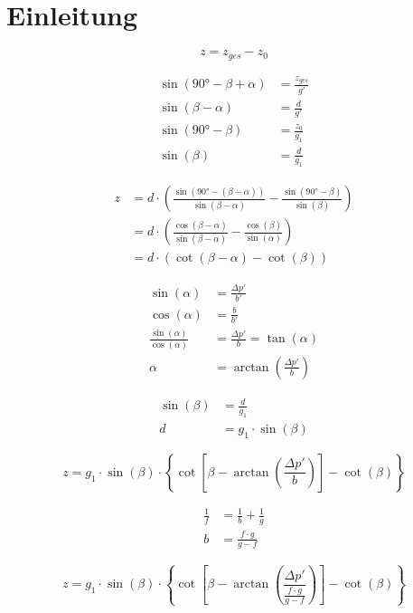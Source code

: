 \section{Einleitung}

\begin{equation}
	z = z_{ges} - z_0
\end{equation}

\begin{align}
	\sin(\ang{90}-\beta+\alpha) &= \frac{z_{ges}}{g'}\\ \sin(\beta-\alpha) &= \frac{d}{g'}\\
	\sin(\ang{90}-\beta) &= \frac{z_0}{g_1}\\ \sin(\beta) &= \frac{d}{g_1}
\end{align}

\begin{align}
	z &= d\cdot\left(\frac{\sin(\ang{90}-(\beta-\alpha))}{\sin(\beta-\alpha)}-\frac{\sin(\ang{90}-\beta)}{\sin(\beta)}\right)\\
	  &= d\cdot\left(\frac{\cos(\beta-\alpha)}{\sin(\beta-\alpha)}-\frac{\cos(\beta)}{\sin(\alpha)}\right)\\
	  &= d\cdot\left(\cot(\beta-\alpha)-\cot(\beta)\right)
\end{align}

\begin{align}
	\sin(\alpha) &= \frac{\Delta p'}{b'}\\
	\cos(\alpha) &= \frac{b}{b'}\\
	\frac{\sin(\alpha)}{\cos(\alpha)} &= \frac{\Delta p'}{b} = \tan(\alpha)\\
	\alpha &= \arctan\left(\frac{\Delta p'}{b}\right)
\end{align}

\begin{align}
	\sin(\beta) &= \frac{d}{g_1}\\
	d &= g_1\cdot\sin(\beta)
\end{align}

\begin{equation}
	z = g_1\cdot\sin(\beta)\cdot\left\{\cot\left[\beta-\arctan\left(\frac{\Delta p'}{b}\right)\right]-\cot(\beta)\right\}
\end{equation}

\begin{align}
	\frac{1}{f} &= \frac{1}{b} + \frac{1}{g}\\
	b &= \frac{f\cdot g}{g-f}
\end{align}

\begin{equation}
	z = g_1\cdot\sin(\beta)\cdot\left\{\cot\left[\beta-\arctan\left(\frac{\Delta p'}{\frac{f\cdot g}{g-f}}\right)\right]-\cot(\beta)\right\}
\end{equation}